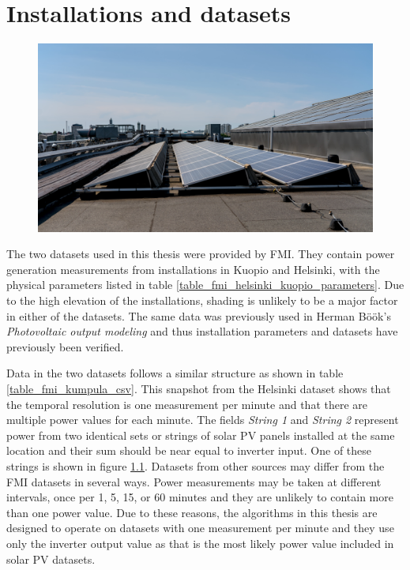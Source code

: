 \chapter{Installations and datasets}

\begin{figure}[h]
\centering
\includegraphics[width=0.8\linewidth]{pics/fmikumpula}
\label{fig_fmikumpula_panels}
\end{figure}


\noindent The two datasets used in this thesis were provided by FMI. They contain power generation measurements from installations in Kuopio and Helsinki, with the physical parameters listed in table \ref{table_fmi_helsinki_kuopio_parameters}. Due to the high elevation of the installations, shading is unlikely to be a major factor in either of the datasets. The same data was previously used in Herman Böök's \textit{Photovoltaic output modeling}\cite{hbook1} and thus installation parameters and datasets have previously been verified.

Data in the two datasets follows a similar structure as shown in table \ref{table_fmi_kumpula_csv}. This snapshot from the Helsinki dataset shows that the temporal resolution is one measurement per minute and that there are multiple power values for each minute. The fields \textit{String 1} and \textit{String 2} represent power from two identical sets or strings of solar PV panels installed at the same location and their sum should be near equal to inverter input. One of these strings is shown in figure \ref{fig_fmikumpula_panels}. Datasets from other sources may differ from the FMI datasets in several ways. Power measurements may be taken at different intervals, once per 1, 5, 15, or 60 minutes and they are unlikely to contain more than one power value. Due to these reasons, the algorithms in this thesis are designed to operate on datasets with one measurement per minute and they use only the inverter output value as that is the most likely power value included in solar PV datasets.


